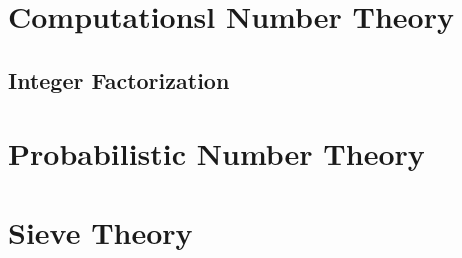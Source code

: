 \section{Computationsl Number Theory}\label{sec:computational_number_theory}

\subsection{Integer Factorization}\label{sec:integer_factorization}



\section{Probabilistic Number Theory}\label{sec:probabilistic_number_theory}

\section{Sieve Theory}\label{sec:sieve_theory}
